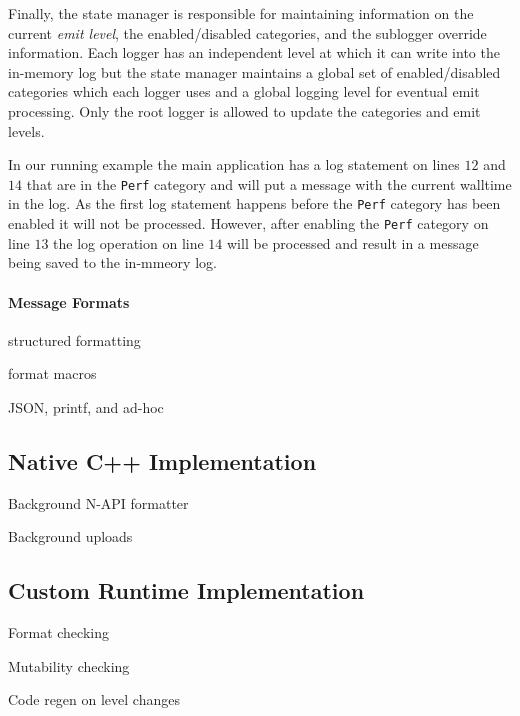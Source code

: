 Finally, the state manager is responsible for maintaining information on the current 
\emph{emit level}, the enabled/disabled categories, and the sublogger override information. 
Each logger has an independent level at which it can write into the in-memory log but 
the state manager maintains a global set of enabled/disabled categories which each logger 
uses and a global logging level for eventual emit processing. Only the root logger is 
allowed to update the categories and emit levels. 

In our running example the main application has a log statement on lines $12$ and $14$ 
that are in the \texttt{Perf} category and will put a message with the current walltime 
in the log. As the first log statement happens before the \texttt{Perf} category has 
been enabled it will not be processed. However, after enabling the \texttt{Perf} category 
on line $13$ the log operation on line $14$ will be processed and result in a message 
being saved to the in-mmeory log.

\paragraph{Message Formats}
\noindent

structured formatting

format macros

JSON, printf, and ad-hoc

\subsection{Native C++ Implementation}

Background N-API formatter

Background uploads

\subsection{Custom Runtime Implementation}

Format checking

Mutability checking

Code regen on level changes
